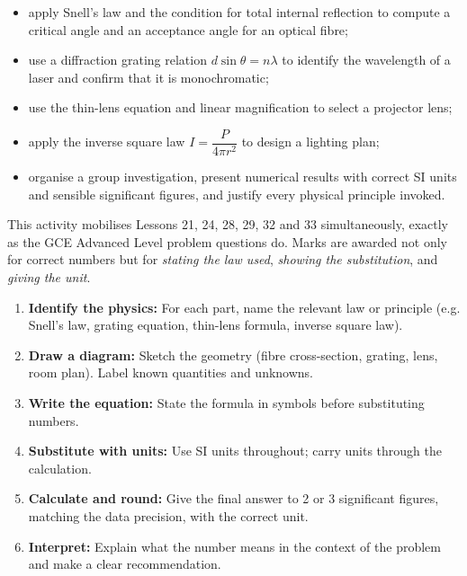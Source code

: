\documentclass[11pt]{article}
\newcommand{\cle}[1]{{\popxbold\color{popdark}#1}}
\begin{document}
\begin{itemize}
\item apply \cle{Snell's law} and the condition for \cle{total internal reflection} to compute a critical angle and an acceptance angle for an optical fibre;
\item use a \cle{diffraction grating} relation $d\sin\theta = n\lambda$ to identify the wavelength of a laser and confirm that it is monochromatic;
\item use the \cle{thin-lens equation} and \cle{linear magnification} to select a projector lens;
\item apply the \cle{inverse square law} $I = \dfrac{P}{4\pi r^{2}}$ to design a lighting plan;
\item organise a group investigation, present numerical results with correct SI units and sensible significant figures, and justify every physical principle invoked.
\end{itemize}

\begin{attention}
This activity mobilises Lessons 21, 24, 28, 29, 32 and 33 simultaneously, exactly as the GCE Advanced Level problem questions do. Marks are awarded not only for correct numbers but for \emph{stating the law used}, \emph{showing the substitution}, and \emph{giving the unit}.
\end{attention}

\begin{methode}
\begin{enumerate}
\item \textbf{Identify the physics:} For each part, name the relevant law or principle (e.g. Snell's law, grating equation, thin-lens formula, inverse square law).
\item \textbf{Draw a diagram:} Sketch the geometry (fibre cross-section, grating, lens, room plan). Label known quantities and unknowns.
\item \textbf{Write the equation:} State the formula in symbols before substituting numbers.
\item \textbf{Substitute with units:} Use SI units throughout; carry units through the calculation.
\item \textbf{Calculate and round:} Give the final answer to 2 or 3 significant figures, matching the data precision, with the correct unit.
\item \textbf{Interpret:} Explain what the number means in the context of the problem and make a clear recommendation.
\end{enumerate}
\end{methode}
\end{document}
